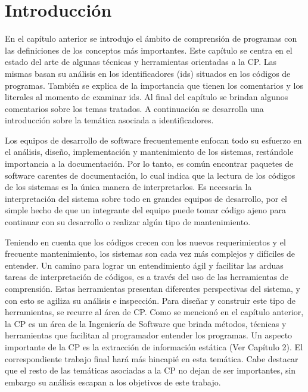 

\section{Introducción}

En el capítulo anterior se introdujo el ámbito de comprensión de programas con las definiciones de los conceptos más importantes. Este capítulo se centra en el estado del arte de algunas técnicas y herramientas orientadas a la CP. Las mismas basan su análisis en los identificadores (ids) situados en los códigos de programas. También se explica de la importancia que tienen los comentarios y los literales al momento de examinar ids. Al final del capítulo se brindan algunos comentarios sobre los temas tratados. A continuación se desarrolla una introducción sobre la temática asociada a identificadores.

Los equipos de desarrollo de software frecuentemente enfocan todo su esfuerzo en el análisis, diseño, implementación y mantenimiento de los sistemas, restándole importancia a la documentación. Por lo tanto, es común encontrar paquetes de software carentes de documentación, lo cual indica que la lectura de los códigos de los sistemas es la única manera de interpretarlos. Es necesaria la interpretación del sistema sobre todo en grandes equipos de desarrollo, por el simple hecho de que un integrante del equipo puede tomar código ajeno para continuar con su desarrollo o realizar algún tipo de mantenimiento.

Teniendo en cuenta que los códigos crecen con los nuevos requerimientos y el frecuente mantenimiento, los sistemas son cada vez más complejos y difíciles de entender. Un camino para lograr un entendimiento ágil y facilitar las arduas tareas de interpretación de códigos, es a través del uso de las herramientas de comprensión. Estas herramientas presentan diferentes perspectivas del sistema, y con esto se agiliza su análisis e inspección. Para diseñar y construir este tipo de herramientas, se recurre al área de CP.
Como se mencionó en el capítulo anterior, la CP es un área de la Ingeniería de Software que brinda métodos, técnicas y herramientas que facilitan al programador entender los programas. Un aspecto importante de la CP es la extracción de información estática (Ver Capítulo 2). El correspondiente trabajo final hará más hincapié en esta temática. Cabe destacar que el resto de las temáticas asociadas a la CP no dejan de ser importantes, sin embargo su análisis escapan a los objetivos de este trabajo.

